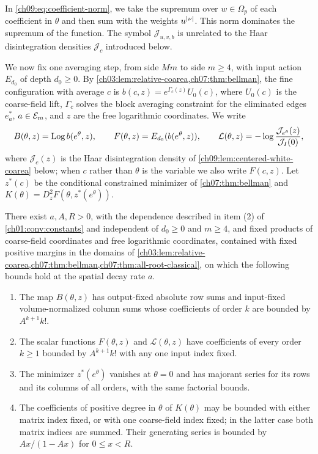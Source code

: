 In \eqref{ch09:eq:coefficient-norm}, we take the supremum over $w\in\Omega_p$ of each coefficient in $\theta$ and then sum with the weights $u^{\lvert \nu\rvert}$. This norm dominates the supremum of the function. The symbol $\mathcal J_{u,v,b}$ is unrelated to the Haar disintegration densities $\mathcal J_c$ introduced below.

We now fix one averaging step, from side $Mm$ to side $m\ge4$, with input action $E_{d_0}$ of depth $d_0\ge0$. By \cref{ch03:lem:relative-coarea,ch07:thm:bellman}, the fine configuration with average $c$ is $b(c,z)=e^{\Gamma_c(z)}U_0(c)$, where $U_0(c)$ is the coarse-field lift, $\Gamma_c$ solves the block averaging constraint for the eliminated edges $e^*_a$, $a\in\mathcal E_{m}$, and $z$ are the free logarithmic coordinates. We write
\[
 B(\theta,z)=\operatorname{Log} b(e^\theta,z),\qquad F(\theta,z)=E_{d_0}(b(e^\theta,z)),
 \qquad \mathcal L(\theta,z)=-\log\frac{\mathcal J_{e^\theta}(z)}{\mathcal J_I(0)},
\]
where $\mathcal J_c(z)$ is the Haar disintegration density of \cref{ch09:lem:centered-white-coarea} below; when $c$ rather than $\theta$ is the variable we also write $F(c,z)$. Let $z^*(c)$ be the conditional constrained minimizer of \cref{ch07:thm:bellman} and $K(\theta)=D_z^2F(\theta,z^*(e^\theta))$.

\begin{lemma}\label{ch09:lem:local-calculus}
There exist $a,A,R>0$, with the dependence described in item (2) of \cref{ch01:conv:constants} and independent of $d_0\ge0$ and $m\ge4$, and fixed products of coarse-field coordinates and free logarithmic coordinates, contained with fixed positive margins in the domains of \cref{ch03:lem:relative-coarea,ch07:thm:bellman,ch07:thm:all-root-classical}, on which the following bounds hold at the spatial decay rate $a$.
\begin{enumerate}
\item The map $B(\theta,z)$ has output-fixed absolute row sums and input-fixed volume-normalized column sums whose coefficients of order $k$ are bounded by $A^{k+1}k!$.
\item The scalar functions $F(\theta,z)$ and $\mathcal L(\theta,z)$ have coefficients of every order $k\ge1$ bounded by $A^{k+1}k!$ with any one input index fixed.
\item The minimizer $z^*(e^\theta)$ vanishes at $\theta=0$ and has majorant series for its rows and its columns of all orders, with the same factorial bounds.
\item The coefficients of positive degree in $\theta$ of $K(\theta)$ may be bounded with either matrix index fixed, or with one coarse-field index fixed; in the latter case both matrix indices are summed. Their generating series is bounded by $Ax/(1-Ax)$ for $0\le x<R$.
\end{enumerate}
\end{lemma}

